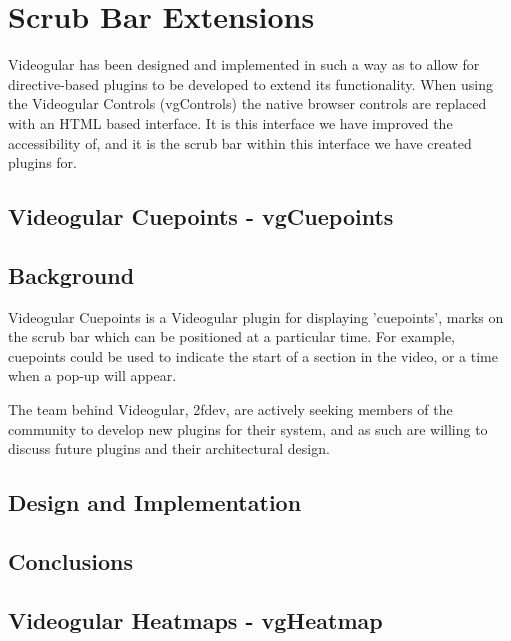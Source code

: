 \section{Scrub Bar Extensions} 
\label{Section:Scrub Bar Extensions}

\gls{Videogular} has been designed and implemented in such a way as to allow for directive-based plugins to be developed to extend its functionality. When using the \gls{Videogular} Controls (vgControls) the native browser controls are replaced with an HTML based interface. It is this interface we have improved the accessibility of, and it is the scrub bar within this interface we have created plugins for.

\subsection{Videogular Cuepoints - vgCuepoints}

\subsection{Background} 
\gls{Videogular} Cuepoints is a \gls{Videogular} plugin for displaying 'cuepoints', marks on the scrub bar which can be positioned at a particular time. For example, cuepoints could be used to indicate the start of a section in the video, or a time when a pop-up will appear.

The team behind \gls{Videogular}, 2fdev, are actively seeking members of the community to develop new plugins for their system, and as such are willing to discuss future plugins and their architectural design.

\subsection{Design and Implementation}

\subsection{Conclusions} 

\subsection{Videogular Heatmaps - vgHeatmap}